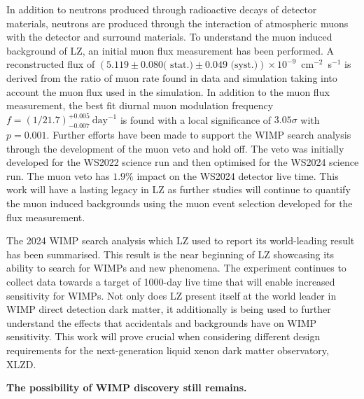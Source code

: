 In addition to neutrons produced through radioactive decays of detector materials, neutrons are produced through the interaction of atmospheric muons with the detector and surround materials. To understand the muon induced background of LZ, an initial muon flux measurement has been performed. A reconstructed flux of $(5.119 \pm 0.080 \textrm{( stat.)} \pm 0.049 \textrm{ (syst.)})\times10^{-9}$~cm$^{-2}$~s$^{-1}$ is derived from the ratio of muon rate found in data and simulation taking into account the muon flux used in the simulation. In addition to the muon flux measurement, the best fit diurnal muon modulation frequency $f=(1/21.7)^{+0.005}_{-0.007}~\text{day}^{-1}$ is found with a local significance of $3.05\sigma$ with $p=0.001$. Further efforts have been made to support the WIMP search analysis through the development of the muon veto and hold off. The veto was initially developed for the WS2022 science run and then optimised for the WS2024 science run. The muon veto has $1.9\%$ impact on the WS2024 detector live time. This work will have a lasting legacy in LZ as further studies will continue to quantify the muon induced backgrounds using the muon event selection developed for the flux measurement.

The 2024 WIMP search analysis which LZ used to report its world-leading result has been summarised. This result is the near beginning of LZ showcasing its ability to search for WIMPs and new phenomena. The experiment continues to collect data towards a target of 1000-day live time that will enable increased sensitivity for WIMPs. Not only does LZ present itself at the world leader in WIMP direct detection dark matter, it additionally is being used to further understand the effects that accidentals and backgrounds have on WIMP sensitivity. This work will prove crucial when considering different design requirements for the next-generation liquid xenon dark matter observatory, XLZD.

\centering
\textbf{The possibility of WIMP discovery still remains.}